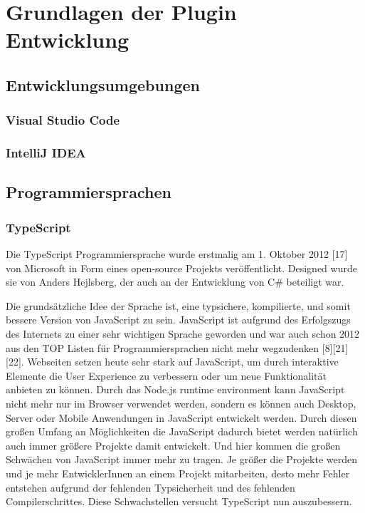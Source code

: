 \chapter{Grundlagen der Plugin Entwicklung}
\label{cha:Grundlagen}

\section{Entwicklungsumgebungen}
\label{sec:Entwicklungsumgebungen}

\subsection{Visual Studio Code}

\subsection{IntelliJ IDEA}


\section{Programmiersprachen}
\label{sec:Programmiersprachen}

\subsection{TypeScript}

Die TypeScript Programmiersprache wurde erstmalig am 1. Oktober 2012 [17] von 
Microsoft in Form eines open-source Projekts veröffentlicht. Designed wurde sie 
von Anders Hejlsberg, der auch an der Entwicklung von C\# beteiligt war. 

Die grundsätzliche Idee der Sprache ist, eine typsichere, kompilierte, und somit 
bessere Version von JavaScript zu sein. JavaScript ist aufgrund des Erfolgszugs
des Internets zu einer sehr wichtigen Sprache geworden und war auch schon 2012 
aus den TOP Listen für Programmiersprachen nicht mehr wegzudenken [8][21] [22]. 
Webseiten setzen heute sehr stark auf JavaScript, um durch interaktive Elemente 
die User Experience zu verbessern oder um neue Funktionalität anbieten zu können. 
Durch das Node.js runtime environment kann JavaScript nicht mehr nur im Browser 
verwendet werden, sondern es können auch Desktop, Server oder Mobile Anwendungen 
in JavaScript entwickelt werden. Durch diesen großen Umfang an Möglichkeiten die 
JavaScript dadurch bietet werden natürlich auch immer größere Projekte damit entwickelt. 
Und hier kommen die großen Schwächen von JavaScript immer mehr zu tragen. 
Je größer die Projekte werden und je mehr EntwicklerInnen an einem Projekt 
mitarbeiten, desto mehr Fehler entstehen aufgrund der fehlenden Typsicherheit
und des fehlenden Compilerschrittes. Diese Schwachstellen versucht TypeScript 
nun auszubessern.


